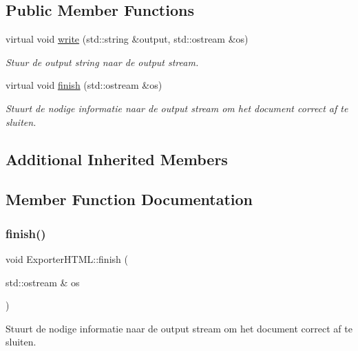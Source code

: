 \subsection*{Public Member Functions}
\begin{DoxyCompactItemize}
\item 
virtual void \hyperlink{class_exporter_h_t_m_l_ace2649c240282289d4cb3bfbd19e427c}{write} (std\+::string \&output, std\+::ostream \&os)
\begin{DoxyCompactList}\small\item\em Stuur de output string naar de output stream. \end{DoxyCompactList}\item 
virtual void \hyperlink{class_exporter_h_t_m_l_aefa1c658f3c3c55bd7725bdad09629b3}{finish} (std\+::ostream \&os)
\begin{DoxyCompactList}\small\item\em Stuurt de nodige informatie naar de output stream om het document correct af te sluiten. \end{DoxyCompactList}\end{DoxyCompactItemize}
\subsection*{Additional Inherited Members}


\subsection{Member Function Documentation}
\mbox{\label{class_exporter_h_t_m_l_aefa1c658f3c3c55bd7725bdad09629b3}} 
\subsubsection{\texorpdfstring{finish()}{finish()}}
{\footnotesize\ttfamily void Exporter\+H\+T\+M\+L\+::finish (\begin{DoxyParamCaption}\item[{std\+::ostream \&}]{os }\end{DoxyParamCaption})\hspace{0.3cm}{\ttfamily [virtual]}}



Stuurt de nodige informatie naar de output stream om het document correct af te sluiten. 


